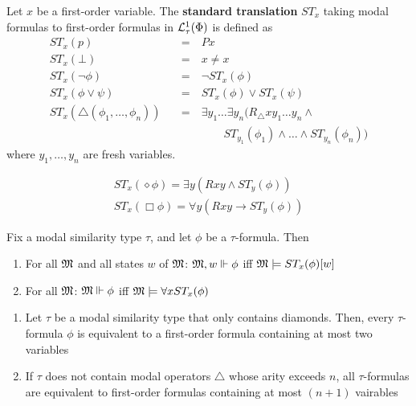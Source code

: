 \documentclass[11pt]{article}
\begin{document}
\begin{definition}
Let \(x\) be a first-order variable. The \textbf{standard translation} \(ST_x\) taking
modal formulas to first-order formulas in \(\mathcal{L}_\tau^1(\Phi)\) is defined as
\begin{align*}
ST_x(p)&\quad\text{=}\quad Px\\
ST_x(\bot)&\quad\text{=}\quad x\neq x\\
ST_x(\neg\phi)&\quad\text{=}\quad \neg ST_x(\phi)\\
ST_x(\phi\vee\psi)&\quad\text{=}\quad ST_x(\phi)\vee ST_x(\psi)\\
ST_x(\triangle(\phi_1,\dots,\phi_n))&\quad\text{=}\quad \exists y_1\dots
\exists y_n(R_{\triangle} xy_1\dots y_n\wedge\\
&\hspace{2cm}ST_{y_1}(\phi_1)\wedge\dots\wedge ST_{y_n}(\phi_n) )
\end{align*}
where \(y_1,\dots,y_n\) are fresh variables.
\end{definition}

\begin{gather*}
ST_x(\diamond\phi)=\exists y(Rxy\wedge ST_y(\phi))\\
ST_x(\Box\phi)=\forall y(Rxy\to ST_y(\phi))
\end{gather*}

\begin{proposition}
\label{prop2.47}
Fix a modal similarity type \(\tau\), and let \(\phi\) be a \(\tau\)-formula. Then
\begin{enumerate}
\item For all \(\mathfrak{M}\) and all states \(w\) of \(\mathfrak{M}\): \(\mathfrak{M},w\Vdash \phi\) iff
\(\mathfrak{M}\models ST_x(\phi)[w]\)
\item For all \(\mathfrak{M}\): \(\mathfrak{M}\Vdash\phi\) iff \(\mathfrak{M}\models\forall x ST_x(\phi)\)
\end{enumerate}
\end{proposition}

\begin{proposition}[]
\begin{enumerate}
\item Let \(\tau\) be a modal similarity type that only contains diamonds. Then, every
\(\tau\)-formula \(\phi\) is equivalent to a first-order formula containing at
most two variables
\item If \(\tau\) does not contain modal operators \(\triangle\) whose arity exceeds
\(n\), all \(\tau\)-formulas are equivalent to first-order formulas
containing at most \((n+1)\) vairables
\end{enumerate}
\end{proposition}
\end{document}
